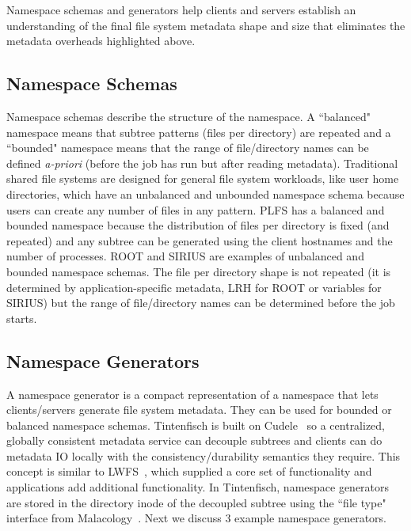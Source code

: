 
Namespace schemas and generators help clients and servers establish an
understanding of the final file system metadata shape and size that eliminates
the metadata overheads highlighted above.

\vspace{-0.5em}
\subsection{Namespace Schemas}
\label{sec:namespace-schemas}
\vspace{-0.5em}

Namespace schemas describe the structure of the namespace. A ``balanced"
namespace means that subtree patterns (files per directory) are repeated and a
``bounded" namespace means that the range of file/directory names can be
defined {\it a-priori} (before the job has run but after reading metadata).
Traditional shared file systems are designed for general file system workloads,
like user home directories, which have an unbalanced and unbounded namespace
schema because users can create any number of files in any pattern.  PLFS has a
balanced and bounded namespace because the distribution of files per directory
is fixed (and repeated) and any subtree can be generated using the client
hostnames and the number of processes.  ROOT and SIRIUS are examples of
unbalanced and bounded namespace schemas. The file per directory shape is not
repeated (it is determined by application-specific metadata, LRH for ROOT or
variables for SIRIUS) but the range of file/directory names can be determined
before the job starts.

\vspace{-0.5em}
\subsection{Namespace Generators}
\label{sec:namespace-generators}
\vspace{-0.5em}

A namespace generator is a compact representation of a namespace that lets
clients/servers generate file system metadata. They can be used for bounded or
balanced namespace schemas.  Tintenfisch is built on
Cudele~\cite{sevilla:ipdps18-cudele} so a centralized, globally consistent
metadata service can decouple subtrees and clients can do metadata IO locally
with the consistency/durability semantics they require. This concept is similar
to LWFS~\cite{oldfield:cc06-lwfs}, which supplied a core set of functionality
and applications add additional functionality.  In Tintenfisch, namespace
generators are stored in the directory inode of the decoupled subtree using
the ``file type" interface from Malacology~\cite{sevilla:eurosys17-malacology}.
Next we discuss 3 example namespace generators.

